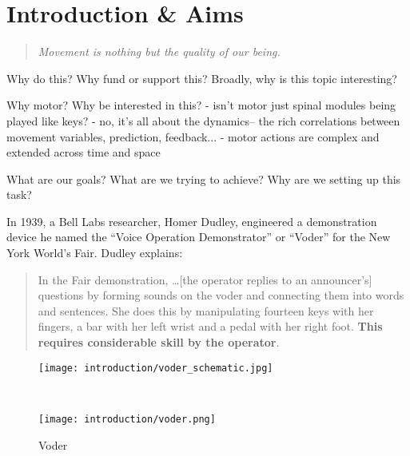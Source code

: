 \documentclass[../main.tex]{subfiles}
\begin{document}
\chapter{Introduction \& Aims}\label{chap:intro}

\bigskip
\begin{quote}
  \emph{Movement is nothing but the quality of our being.}
  
\end{quote}

\cleardoublepage%

Why do this? Why fund or support this? Broadly, why is this topic interesting?

Why motor? Why be interested in this?
- isn't motor just spinal modules being played like keys?
- no, it's all about the dynamics-- the rich correlations between movement variables, prediction, feedback...
- motor actions are complex and extended across time and space

What are our goals? What are we trying to achieve? Why are we setting up this task? 


In 1939, a Bell Labs researcher, Homer Dudley, engineered a demonstration device he named the ``Voice Operation Demonstrator'' or ``Voder'' for the New York World's Fair\cite{Dudley}. Dudley explains:

\begin{quote}
  In the Fair demonstration, \ldots [the operator replies to an announcer's] questions by forming sounds on the voder and connecting them into words and sentences. She does this by manipulating fourteen keys with her fingers, a bar with her left wrist and a pedal with her right foot. \textbf{This requires considerable skill by the operator}.
\end{quote}


\begin{figure}
  \centering
  \begin{minipage}{0.8\textwidth}
    \texttt{[image: introduction/voder\_schematic.jpg]}
    \subcaption{}
  \end{minipage}\\%
  \begin{minipage}{0.5\textwidth}
    \texttt{[image: introduction/voder.png]}
    \subcaption{}
  \end{minipage}
  \caption{Voder}\label{fig:voder}
\end{figure}
\end{document}
